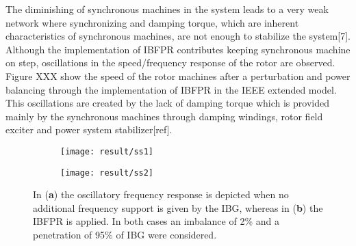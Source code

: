 The diminishing of synchronous machines in the system leads to a very weak network where synchronizing and damping torque, which are inherent characteristics of synchronous machines, are not enough to stabilize the system[7]. Although the implementation of IBFPR contributes keeping synchronous machine on step, oscillations in the speed/frequency response of the rotor are observed. Figure XXX show the speed of the rotor machines after a perturbation and power balancing through the implementation of IBFPR in the IEEE extended model. This oscillations are created by the lack of damping torque which is provided mainly by the synchronous machines through damping windings, rotor field exciter and power system stabilizer[ref]. \\

\begin{figure}[h]
	\centering
	\begin{subfigure}[h]{0.49\textwidth}
		\centering
		\texttt{[image: result/ss1]}
		\caption{}
		\label{fig:res_osc_noIBFPR}
	\end{subfigure}
	\hfill
	\begin{subfigure}[h]{0.49\textwidth}
		\centering
		\texttt{[image: result/ss2]}
		\caption{}
		\label{fig:res_osc_IBFPR}
	\end{subfigure}
	
	
	\caption{In (\textbf{a}) the oscillatory frequency response is depicted when no additional frequency support is given by the IBG, whereas in  (\textbf{b}) the IBFPR is applied. In both cases an imbalance of 2\% and a penetration of 95\% of IBG were considered.}
\end{figure}

